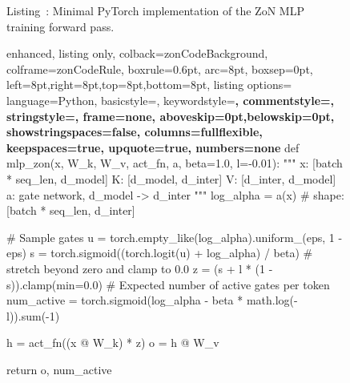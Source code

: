 \begingroup
{}
\begin{figure}[t]
\label{fig:zon_mlp_listing}
\begin{center}
Listing~\thelstlisting: Minimal PyTorch implementation of the ZoN MLP training forward pass.
\end{center}
\begin{tcblisting}{
    enhanced,
    listing only,
    colback=zonCodeBackground,
    colframe=zonCodeRule,
    boxrule=0.6pt,
    arc=8pt,
    boxsep=0pt,
    left=8pt,right=8pt,top=8pt,bottom=8pt,
    listing options={
        language=Python,
        basicstyle=\selectfont\small,
        keywordstyle=\color{zonCodeKeyword}\bfseries,
        commentstyle=\color{zonCodeComment},
        stringstyle=\color{purple},
        frame=none,
        aboveskip=0pt,belowskip=0pt,
        showstringspaces=false,
        columns=fullflexible,
        keepspaces=true,
        upquote=true,
        numbers=none
    }
}
def mlp_zon(x, W_k, W_v, act_fn, a, beta=1.0, l=-0.01):
    """
    x: [batch * seq_len, d_model]
    K: [d_model, d_inter]
    V: [d_inter, d_model]
    a: gate network, d_model -> d_inter
    """
    log_alpha = a(x) # shape: [batch * seq_len, d_inter]

    # Sample gates
    u = torch.empty_like(log_alpha).uniform_(eps, 1 - eps)
    s = torch.sigmoid((torch.logit(u) + log_alpha) / beta)
    # stretch beyond zero and clamp to 0.0
    z = (s + l * (1 - s)).clamp(min=0.0)
    # Expected number of active gates per token
    num_active = torch.sigmoid(log_alpha - beta * math.log(-l)).sum(-1)

    h = act_fn((x @ W_k) * z)
    o = h @ W_v

    return o, num_active
\end{tcblisting}
\end{figure}
\endgroup
